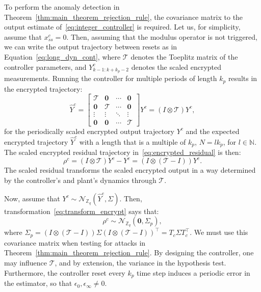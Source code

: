 \documentclass[journal, twoside, web]{ieeecolorpreprint}
\begin{document}
To perform the anomaly detection in Theorem~\ref{thm:main_theorem_rejection_rule}, the covariance matrix to the output estimate of~\eqref{eq:integer_controller} is required. Let us, for simplicity, assume that $x_{ss}^c=0$. Then, assuming that the modulus operator is not triggered, we can write the output trajectory between resets as in Equation~\eqref{eq:long_dyn_cont}, where $\mathcal{T}$ denotes the Toeplitz matrix of the controller parameters, and $Y^c_{k-1:k+k_p-2}$ denotes the scaled encrypted measurements. Running the controller for multiple periods of length $k_p$ results in the encrypted trajectory:
\begin{equation*}
    \hat Y^c =\begin{bmatrix}
        \mathcal{T} & \textbf{0} & \cdots & \textbf{0} \\
        \textbf{0} & \mathcal{T} & \cdots & \textbf{0} \\
        \vdots & \vdots & \ddots & \vdots \\
        \textbf{0} & \textbf{0} & \cdots & \mathcal{T}
    \end{bmatrix} Y^c = (I \otimes \mathcal{T})Y^c,
\end{equation*}
for the periodically scaled encrypted output trajectory $Y^c$ and the expected encrypted trajectory $\hat Y^c$ with a length that is a multiple of $k_p$, $N=lk_p$, for $l \in \mathbb{N}$. The scaled encrypted residual trajectory in~\eqref{eq:encrypted_residual} is then:
\begin{equation}\label{eq:transform_encrypt}
   \rho^c = (I \otimes \mathcal{T})Y^c-Y^c = (I \otimes (\mathcal{T}-I))Y^c.
\end{equation}
The scaled residual transforms the scaled encrypted output in a way determined by the controller's and plant's dynamics through $\mathcal{T}$.

Now, assume that $Y^c \sim \mathcal{N}_{\mathbb{Z}_q}(\hat Y^e,\Sigma)$. Then, transformation~\eqref{eq:transform_encrypt} says that:
\begin{equation*}
    \rho^c \sim \mathcal{N}_{\mathbb{Z}_q}(\textbf{0},\Sigma_p), 
\end{equation*}
where $\Sigma_p = (I \otimes (\mathcal{T}-I)) \Sigma (I \otimes (\mathcal{T}-I))^\top=T_c \Sigma T_c^\top$. We must use this covariance matrix when testing for attacks in Theorem~\ref{thm:main_theorem_rejection_rule}. By designing the controller, one may influence $\mathcal{T}$, and by extension, the variance in the hypothesis test. Furthermore, the controller reset every $k_p$ time step induces a periodic error in the estimator, so that $\epsilon_0, \epsilon_\infty \neq 0$.
\end{document}
